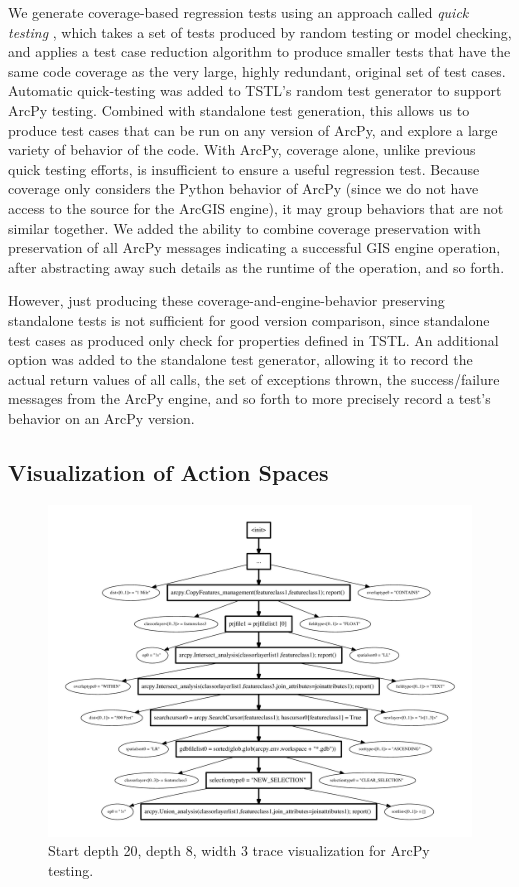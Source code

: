 We generate coverage-based regression tests using an approach called \emph{quick
  testing} \cite{icst14,stvrcausereduce}, which takes a set of tests
produced by random testing or model checking, and applies a test case reduction
algorithm \cite{DD} to produce smaller tests that have the same code
coverage as the very large, highly redundant, original set of test
cases.  Automatic quick-testing was added to TSTL's random test
generator to support ArcPy testing.  Combined with standalone test
generation, this allows us to produce test cases that can be run on
any version of ArcPy, and explore a large variety of behavior of the
code.  With ArcPy, coverage alone, unlike previous quick testing
efforts, is insufficient to ensure a useful regression test.  Because
coverage only considers the Python behavior of ArcPy (since we do not
have access to the source for the ArcGIS engine), it may group
behaviors that are not similar together.  We added the ability to
combine coverage preservation with preservation of all ArcPy messages
indicating a successful GIS engine operation, after abstracting away
such details as the runtime of the operation, and so forth.

However, just producing these coverage-and-engine-behavior preserving
standalone tests is not sufficient for good version comparison, since
standalone test cases as produced only check for properties defined in TSTL.  An
additional option was added to the standalone test generator, allowing
it to record the actual return values of all calls, the set of
exceptions thrown, the success/failure messages from the ArcPy engine, and so forth to more precisely record a test's
behavior on an ArcPy version.


\subsection{Visualization of Action Spaces}

\begin{figure}
\includegraphics[width=\columnwidth]{shortgraph}
\caption{Start depth 20, depth 8, width 3 trace visualization for ArcPy testing.}
\label{fig:actions}
\end{figure}

